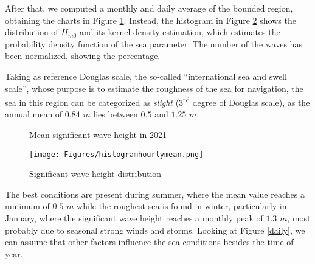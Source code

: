 After that, we computed a monthly and daily average of the bounded region, obtaining the charts in Figure \ref{mean}. Instead, the histogram in Figure \ref{histogram} shows the distribution of $H_{m0}$ and its kernel density estimation, which estimates the probability density function of the sea parameter. The number of the waves has been normalized, showing the percentage.

Taking as reference Douglas scale, the so-called ``international sea and swell scale'', whose purpose is to estimate the roughness of the sea for navigation, the sea in this region can be categorized as \textit{slight} (3\textsuperscript{rd} degree of Douglas scale), as the annual mean of $0.84$ $m$ lies between $0.5$ and $1.25$ $m$. 
\newpage
\begin{figure}[H]
	\centering 
	\hspace{0.5cm}
	\caption{Mean significant wave height in 2021} 
	\label{mean}
\end{figure}
\begin{figure}[H]
	\centering
	\texttt{[image: Figures/histogramhourlymean.png]}
	\caption{Significant wave height distribution}
	\label{histogram}
\end{figure} 
\noindent
The best conditions are present during summer, where the mean value reaches a minimum of $0.5$ $m$ while the roughest sea is found in winter, particularly in January, where the significant wave height reaches a monthly peak of $1.3$ $m$, most probably due to seasonal strong winds and storms.
Looking at Figure \ref{daily}, we can assume that other factors influence the sea conditions besides the time of year. 
